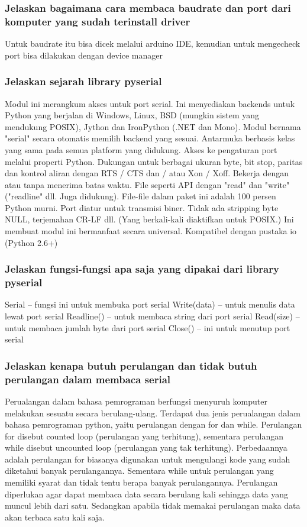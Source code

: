 \subsubsection{Jelaskan bagaimana cara membaca baudrate dan port dari komputer yang sudah terinstall driver}
Untuk baudrate itu bisa dicek melalui arduino IDE, kemudian untuk mengecheck port bisa dilakukan dengan device manager

\subsubsection{Jelaskan sejarah library pyserial}
Modul ini merangkum akses untuk port serial. Ini menyediakan backends untuk Python yang berjalan di Windows, Linux, BSD (mungkin sistem yang mendukung POSIX), Jython dan IronPython (.NET dan Mono). Modul bernama "serial" secara otomatis memilih backend yang sesuai. Antarmuka berbasis kelas yang sama pada semua platform yang didukung.
Akses ke pengaturan port melalui properti Python.
Dukungan untuk berbagai ukuran byte, bit stop, paritas dan kontrol aliran dengan RTS / CTS dan / atau Xon / Xoff.
Bekerja dengan atau tanpa menerima batas waktu.
File seperti API dengan "read" dan "write" ("readline" dll. Juga didukung).
File-file dalam paket ini adalah 100 persen Python murni.
Port diatur untuk transmisi biner. Tidak ada stripping byte NULL, terjemahan CR-LF dll. (Yang berkali-kali diaktifkan untuk POSIX.) Ini membuat modul ini bermanfaat secara universal.
Kompatibel dengan pustaka io (Python 2.6+)

\subsubsection{Jelaskan fungsi-fungsi apa saja yang dipakai dari library pyserial}


Serial – fungsi ini untuk membuka port serial
Write(data) – untuk menulis data lewat port serial
Readline() – untuk membaca string dari port serial
Read(size) – untuk membaca jumlah byte dari port serial
Close() – ini untuk menutup port serial 

\subsubsection{Jelaskan kenapa butuh perulangan dan tidak butuh perulangan dalam membaca serial}


Perualangan dalam bahasa pemrograman berfungsi menyuruh komputer melakukan sesuatu secara berulang-ulang. Terdapat dua jenis perualangan dalam bahasa pemrograman python, yaitu perulangan dengan for dan while.
Perulangan for disebut counted loop (perulangan yang terhitung), sementara perulangan while disebut uncounted loop (perulangan yang tak terhitung). Perbedaannya adalah perulangan for biasanya digunakan untuk mengulangi kode yang sudah diketahui banyak perulangannya. Sementara while untuk perulangan yang memiliki syarat dan tidak tentu berapa banyak perulangannya.
Perulangan diperlukan agar dapat membaca data secara berulang kali sehingga data yang muncul lebih dari satu. Sedangkan apabila tidak memakai perulangan maka data akan terbaca satu kali saja.

